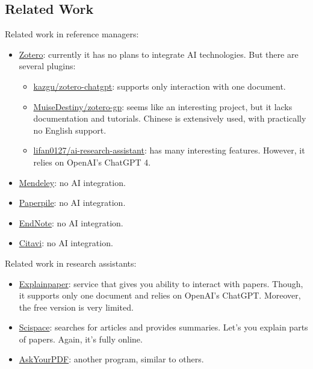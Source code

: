 \documentclass{article}
\begin{document}
	\subsection{Related Work}
	Related work in reference managers:
	\begin{itemize}
		\item \href{https://www.zotero.org/}{Zotero}: currently it has no plans to integrate AI technologies. But there are several plugins:
		\begin{itemize}
			\item \href{https://github.com/kazgu/zotero-chatgpt}{kazgu/zotero-chatgpt}: supports only interaction with one document.
			
			\item \href{https://github.com/MuiseDestiny/zotero-gpt}{MuiseDestiny/zotero-gp}: seems like an interesting project, but it lacks documentation and tutorials. Chinese is extensively used, with practically no English support.
			
			\item \href{https://github.com/lifan0127/ai-research-assistant}{lifan0127/ai-research-assistant}: has many interesting features. However, it relies on OpenAI's ChatGPT 4.
		\end{itemize}
		
		\item \href{https://www.mendeley.com/}{Mendeley}: no AI integration.
		
		\item \href{https://paperpile.com/?welcome}{Paperpile}: no AI integration.
		
		\item \href{https://endnote.com/}{EndNote}: no AI integration.
		
		\item \href{https://www.citavi.com/en}{Citavi}: no AI integration.
	\end{itemize}
	
	Related work in research assistants:
	\begin{itemize}
		\item \href{https://www.explainpaper.com/}{Explainpaper}: service that gives you ability to interact with papers. Though, it supports only one document and relies on OpenAI's ChatGPT. Moreover, the free version is very limited.
		
		\item \href{https://typeset.io/}{Scispace}: searches for articles and provides summaries. Let's you explain parts of papers. Again, it's fully online.
		
		\item \href{https://askyourpdf.com}{AskYourPDF}: another program, similar to others.
	\end{itemize}
	
\end{document}
